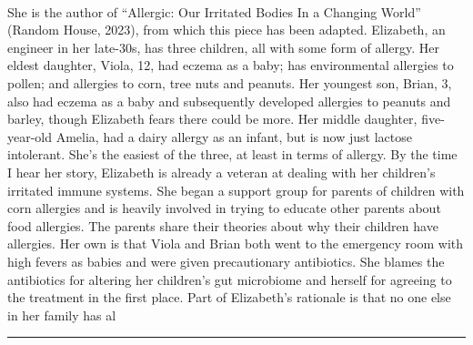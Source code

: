 \documentclass[10pt,a4paper]{article}
\begin{document}
\begin{multicols*}{2}
\paragraph{}
 She is the author of “Allergic: Our Irritated Bodies In a Changing World” (Random House, 2023), from which this piece has been adapted.
Elizabeth, an engineer in her late-30s, has three children, all with some form of allergy. Her eldest daughter, Viola, 12, had eczema as a baby; has environmental allergies to pollen; and allergies to corn, tree nuts and peanuts.
Her youngest son, Brian, 3, also had eczema as a baby and subsequently developed allergies to peanuts and barley, though Elizabeth fears there could be more. Her middle daughter, five-year-old Amelia, had a dairy allergy as an infant, but is now just lactose intolerant. She’s the easiest of the three, at least in terms of allergy.
By the time I hear her story, Elizabeth is already a veteran at dealing with her children’s irritated immune systems. She began a support group for parents of children with corn allergies and is heavily involved in trying to educate other parents about food allergies.
The parents share their theories about why their children have allergies. Her own is that Viola and Brian both went to the emergency room with high fevers as babies and were given precautionary antibiotics. She blames the antibiotics for altering her children’s gut microbiome and herself for agreeing to the treatment in the first place.
Part of Elizabeth’s rationale is that no one else in her family has al
\par\noindent\textcolor{red}{\rule{\linewidth}{0.2mm}}
\vfill
\null
\noindent\begin{minipage}{\linewidth}

\end{minipage}
\end{multicols*}
\end{document}
